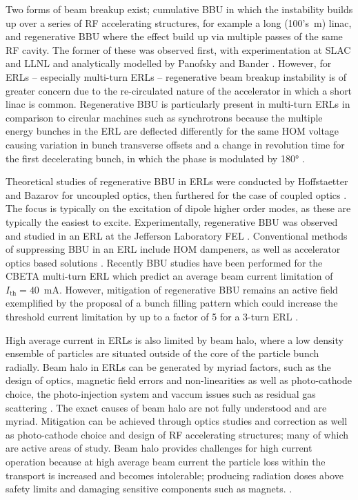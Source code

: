 \documentclass[../main.tex]{subfiles}
\begin{document}
Two forms of beam breakup exist; cumulative BBU in which the instability builds up over a series of RF accelerating structures, for example a long (100's~\si{\meter}) linac, and regenerative BBU where the effect build up via multiple passes of the same RF cavity. The former of these was observed first, with experimentation at SLAC \cite{panofsky1966electrons,altenmueller1966beam} and LLNL \cite{neil1970coherent} and analytically modelled by Panofsky and Bander \cite{panofsky1968asymptotic}. However, for ERLs -- especially multi-turn ERLs -- regenerative beam breakup instability is of greater concern due to the re-circulated nature of the accelerator in which a short linac is common. Regenerative BBU is particularly present in multi-turn ERLs in comparison to circular machines such as synchrotrons because the multiple energy bunches in the ERL are deflected differently for the same HOM voltage causing variation in bunch transverse offsets and a change in revolution time for the first decelerating bunch, in which the phase is modulated by 180\si{\degree} \cite{setiniyaz2021filling}.

Theoretical studies of regenerative BBU in ERLs were conducted by Hoffstaetter and Bazarov \cite{hoffstaetter2004beam} for uncoupled optics, then furthered for the case of coupled optics \cite{hoffstaetter2007recirculating}. The focus is typically on the excitation of dipole higher order modes, as these are typically the easiest to excite. Experimentally, regenerative BBU was observed and studied in an ERL at the Jefferson Laboratory FEL \cite{tennant2005first,douglas2006experimental}. Conventional methods of suppressing BBU \cite{tennant2004methods} in an ERL include HOM dampeners, as well as accelerator optics based solutions \cite{rand1980beam}. Recently BBU studies have been performed for the CBETA multi-turn ERL \cite{lou2019beam} which predict an average beam current limitation of $I_{\mathrm{th}} = 40$~\si{\milli\ampere}. However, mitigation of regenerative BBU remains an active field exemplified by the proposal of a bunch filling pattern which could increase the threshold current limitation by up to a factor of 5 for a 3-turn ERL \cite{setiniyaz2021filling}.    

High average current in ERLs is also limited by beam halo, where a low density ensemble of particles are situated outside of the core of the particle bunch radially. Beam halo in ERLs can be generated by myriad factors, such as the design of optics, magnetic field errors and non-linearities as well as photo-cathode choice, the photo-injection system and vaccum issues such as residual gas scattering \cite{neil2006jlab,tanaka2018new}. The exact causes of beam halo are not fully understood and are myriad. Mitigation can be achieved through optics studies and correction as well as photo-cathode choice and design of RF accelerating structures; many of which are active areas of study. Beam halo provides challenges for high current operation because at high average beam current the particle loss within the transport is increased and becomes intolerable; producing radiation doses above safety limits and damaging sensitive components such as magnets. .  
\end{document}
